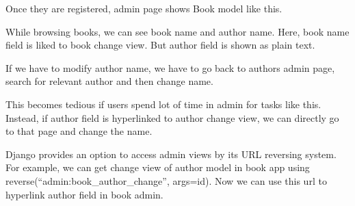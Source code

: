 \documentclass[letterpaper,11pt,english]{sphinxmanual}
\begin{document}
Once they are registered, admin page shows Book model like this.


While browsing books, we can see book name and author name. Here, book name field is liked to book change view. But author field is shown as plain text.

If we have to modify author name, we have to go back to authors admin page, search for relevant author and then change name.

This becomes tedious if users spend lot of time in admin for tasks like this. Instead, if author field is hyperlinked to author change view, we can directly go to that page and change the name.

Django provides an option to access admin views by its URL reversing system. For example, we can get change view of author model in book app using reverse(“admin:book\_author\_change”, args=id). Now we can use this url to hyperlink author field in book admin.

\begin{sphinxVerbatim}[commandchars=\\\{\}]
   
   


 
        

      
           \PYG{p}{[}\PYG{p}{]}
             
         
      
\end{sphinxVerbatim}
\end{document}
